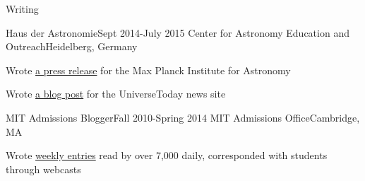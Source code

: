 \documentclass{resume} %
\begin{document}
\begin{rSection}{Writing}

  \begin{rSubsection}
    {Haus der Astronomie}{Sept 2014-July 2015}
    {Center for Astronomy Education and Outreach}{Heidelberg, Germany}
  \item Wrote \href{http://www.mpia.de/news/science/2015-03-biosignatures}
    {a press release} for the Max Planck Institute for Astronomy
  \item Wrote \href{http://www.universetoday.com/120820/distant-stellar-nurseries-this-time-in-high-definition/}
    {a blog post} for the UniverseToday news site
  \end{rSubsection}

  \begin{rSubsection}{MIT Admissions Blogger}{Fall 2010-Spring 2014}
    {MIT Admissions Office}{Cambridge, MA}
  \item Wrote \href{http://mitadmissions.org/blogs/profile/annayq}{weekly entries} read by over 7,000 daily, corresponded with students through webcasts
  \end{rSubsection}

\end{rSection}
\end{document}
